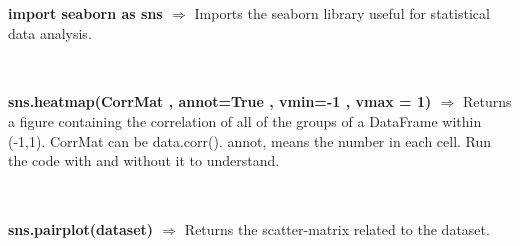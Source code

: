 \documentclass[a4paper,18pt]{article}
\begin{document}

\newpage

\section{\colorbox {Abi}{}}
\subsection{\colorbox {matgreen}{\color{white}{\large import seaborn as sns}}}
\textbf{import seaborn as sns $\Rightarrow$} Imports the seaborn library useful for statistical data analysis.\\\\


\subsection{\colorbox {matgreen}{\color{white}{\large Correlation Matrix}}}
\textbf{sns.heatmap(CorrMat , annot=True , vmin=-1 , vmax = 1) $\Rightarrow$} Returns a figure containing the correlation of all of the groups of a DataFrame within (-1,1). CorrMat can be data.corr(). annot, means the number in each cell. Run the code with and without it to understand.\\\\


\subsection{\colorbox {matgreen}{\color{white}{\large Scatter Matrix}}}
\textbf{sns.pairplot(dataset) $\Rightarrow$} Returns the scatter-matrix related to the dataset.\\\\

\end{document}
